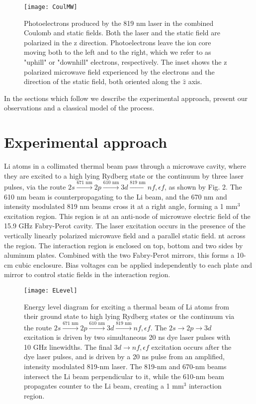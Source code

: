 \documentclass[aps,pra,preprint,groupedaddress]{revtex4-1}
\begin{document}
\begin{figure}
	\texttt{[image: CoulMW]}
	\caption{Photoelectrons produced by the 819 nm laser in the combined Coulomb and static fields. Both the laser and the static field are polarized in the z direction. Photoelectrons leave the ion core moving both to the left and to the right, which we refer to as "uphill" or "downhill" electrons, respectively. The inset shows the z polarized microwave field experienced by the electrons and the direction of the static field, both oriented along the $\hat{z}$ axis.}
	\label{fig:CoulMW}
\end{figure}
In the sections which follow we describe the experimental approach, present our observations and a classical model of the process.


\section{\label{sec:exp} Experimental approach}


Li atoms in a collimated thermal beam pass through a microwave cavity, where they are excited to a high lying Rydberg state or the continuum by three laser pulses, via the route $2s \xrightarrow{\text{671 nm}} 2p \xrightarrow{\text{610 nm}} 3d \xrightarrow{\text{819 nm}} nf, \epsilon f$, as shown by Fig. 2. The 610 nm beam is counterpropagating to the Li beam, and the 670 nm and intensity modulated 819 nm beams cross it at a right angle, forming a 1 mm$^3$ excitation region. This region is at an anti-node of microwave electric field of the 15.9 GHz Fabry-Perot cavity. The laser excitation occurs in the presence of the vertically linearly polarized microwave field and a parallel static field. nt across the region. The interaction region is enclosed on top, bottom and two sides by aluminum plates. Combined with the two Fabry-Perot mirrors, this forms a 10-cm cubic enclosure. Bias voltages can be applied independently to each plate and mirror to control static fields in the interaction region.


\begin{figure}
	\texttt{[image: ELevel]}
	\caption{Energy level diagram for exciting a thermal beam of Li atoms from their ground state to high lying Rydberg states or the continuum via the route $2s \xrightarrow{\text{671 nm}} 2p \xrightarrow{\text{610 nm}} 3d \xrightarrow{\text{819 nm}} nf, \epsilon f$. The $2s \rightarrow 2p \rightarrow 3d$ excitation is driven by two simultaneous 20 ns dye laser pulses with 10 GHz linewidths. The final $3d \rightarrow nf, \epsilon f$ excitation occurs after the dye laser pulses, and is driven by a 20 ns pulse from an amplified, intensity modulated 819-nm laser. The 819-nm and 670-nm beams intersect the Li beam perpendicular to it, while the 610-nm beam propagates counter to the Li beam, creating a 1 mm$^3$ interaction region.}
	\label{fig:ELev}
\end{figure}
\end{document}
